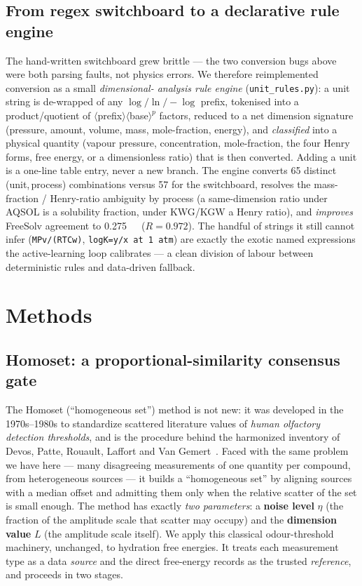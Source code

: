 \documentclass[11pt]{article}
\newcommand{\kcal}{\,\mathrm{kcal\,mol^{-1}}}
\begin{document}
\subsection{From regex switchboard to a declarative rule engine}
\label{sec:rules}
The hand-written switchboard grew brittle --- the two conversion bugs above were both parsing
faults, not physics errors. We therefore reimplemented conversion as a small \emph{dimensional-
analysis rule engine} (\texttt{unit\_rules.py}): a unit string is de-wrapped of any
$\log/\ln/{-}\log$ prefix, tokenised into a product/quotient of $\langle$prefix$\rangle\langle$base$\rangle^{p}$
factors, reduced to a net dimension signature (pressure, amount, volume, mass, mole-fraction,
energy), and \emph{classified} into a physical quantity (vapour pressure, concentration,
mole-fraction, the four Henry forms, free energy, or a dimensionless ratio) that is then converted.
Adding a unit is a one-line table entry, never a new branch. The engine converts \num{65} distinct
(unit,\,process) combinations versus \num{57} for the switchboard, resolves the mass-fraction /
Henry-ratio ambiguity by process (a same-dimension ratio under AQSOL is a solubility fraction, under
KWG/KGW a Henry ratio), and \emph{improves} FreeSolv agreement to \SI{0.275}{\kcal} ($R=0.972$). The
handful of strings it still cannot infer (\texttt{MPv/(RTCw)}, \texttt{logK=y/x at 1 atm}) are exactly
the exotic named expressions the active-learning loop calibrates --- a clean division of labour
between deterministic rules and data-driven fallback.

\section{Methods}

\subsection{Homoset: a proportional-similarity consensus gate}
The Homoset (``homogeneous set'') method is not new: it was developed in the 1970s--1980s to
standardize scattered literature values of \emph{human olfactory detection thresholds}, and is
the procedure behind the harmonized inventory of Devos, Patte, Rouault, Laffort and Van
Gemert~\cite{devos1990}. Faced with the same problem we have here --- many disagreeing
measurements of one quantity per compound, from heterogeneous sources --- it builds a
``homogeneous set'' by aligning sources with a median offset and admitting them only when the
relative scatter of the set is small enough. The method has exactly \emph{two parameters}: a
\textbf{noise level} $\eta$ (the fraction of the amplitude scale that scatter may occupy) and
the \textbf{dimension value} $L$ (the amplitude scale itself). We apply this classical
odour-threshold machinery, unchanged, to hydration free energies. It treats each measurement
type as a data \emph{source} and the direct free-energy records as the trusted \emph{reference},
and proceeds in two stages.
\end{document}
